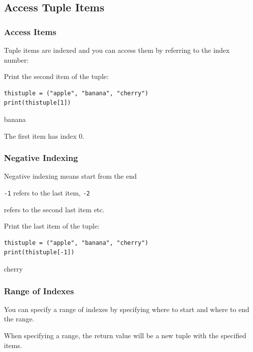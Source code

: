 \documentclass[12pt,a4paper]{article}
\newcommand{\code}[1]{%
	\colorbox{backcolour}{\lstinline{#1}}%
}
\begin{document}
\subsection{Access Tuple Items}
\subsubsection{Access Items}

Tuple items are indexed and you can access them by referring to the index number:

\begin{ebox}
Print the second item of the tuple:
	\begin{lstlisting}
thistuple = ("apple", "banana", "cherry")
print(thistuple[1])
	\end{lstlisting}
\tcblower
	\begin{vercode}
banana
	\end{vercode}
\end{ebox}

\begin{nbox}
The first item has index 0.
\end{nbox}
\subsubsection{Negative Indexing}

Negative indexing means start from the end

\code{-1} refers to the last item, \code{-2}
refers to the second last item etc.

\begin{ebox}
Print the last item of the tuple:
	\begin{lstlisting}
thistuple = ("apple", "banana", "cherry")
print(thistuple[-1])
	\end{lstlisting}
\tcblower
	\begin{vercode}
cherry
	\end{vercode}
\end{ebox}
\subsubsection{Range of Indexes}

You can specify a range of indexes by specifying where to
start and where to end the range.

When specifying a range, the return value will be a new tuple with
the specified items.
\end{document}

